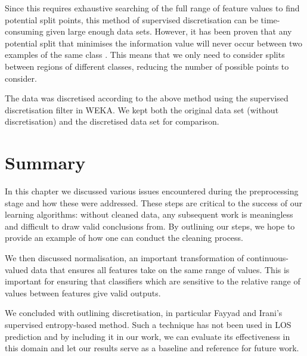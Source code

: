 Since this requires exhaustive searching of the full range of feature values
to find potential split points, this method of supervised discretisation can
be time-consuming given large enough data sets. However, it has been proven
that any potential split that minimises the information value will never occur
between two examples of the same class \cite{Witten2005}.
This means that we only need to
consider splits between regions of different classes, reducing the number of
possible points to consider.

The data was discretised according to the above method using the supervised
discretisation filter in WEKA. We kept both the original data set (without
discretisation) and the discretised data set for comparison.

\section{Summary}
In this chapter we discussed various issues encountered during the
preprocessing stage and how these were addressed. These steps are critical to
the success of our learning algorithms: without cleaned data, any subsequent
work is meaningless and difficult to draw valid conclusions from. By outlining
our steps, we hope to provide an example of how one can conduct the cleaning
process.

We then discussed normalisation, an important transformation of
continuous-valued data that ensures all features take on the same range of
values. This is important for ensuring that classifiers which are sensitive to
the relative range of values between features give valid outputs.

We concluded with outlining discretisation, in particular Fayyad and Irani's
supervised entropy-based method. Such a technique has not been used in LOS
prediction and by including it in our work, we can evaluate its effectiveness
in this domain and let our results serve as a baseline and reference for
future work.
